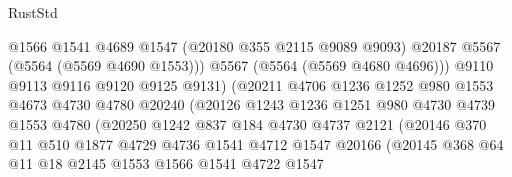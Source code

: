 \begin{lexlean}{RustStd}
\begin{coremodule}
                                  @1566
                                  @1541
                                  @4689
                                  @1547
                                  (@20180 @355 @2115 @9089 @9093)
                                  @20187
                                  @5567
                                  (@5564 (@5569 @4690 @1553)))
                                @5567
                                (@5564 (@5569 @4680 @4696)))
                              @9110
                              @9113
                              @9116
                              @9120
                              @9125
                              @9131)
                            (@20211
                              @4706
                              @1236
                              @1252
                              @980
                              @1553
                              @4673
                              @4730
                              @4780
                              @20240
                              (@20126
                                @1243
                                @1236
                                @1251
                                @980
                                @4730
                                @4739
                                @1553
                                @4780
                                (@20250
                                  @1242
                                  @837
                                  @184
                                  @4730
                                  @4737
                                  @2121
                                  (@20146
                                    @370
                                    @11
                                    @510
                                    @1877
                                    @4729
                                    @4736
                                    @1541
                                    @4712
                                    @1547
                                    @20166
                                    (@20145
                                      @368
                                      @64
                                      @11
                                      @18
                                      @2145
                                      @1553
                                      @1566
                                      @1541
                                      @4722
                                      @1547

\end{coremodule}
\end{lexlean}
